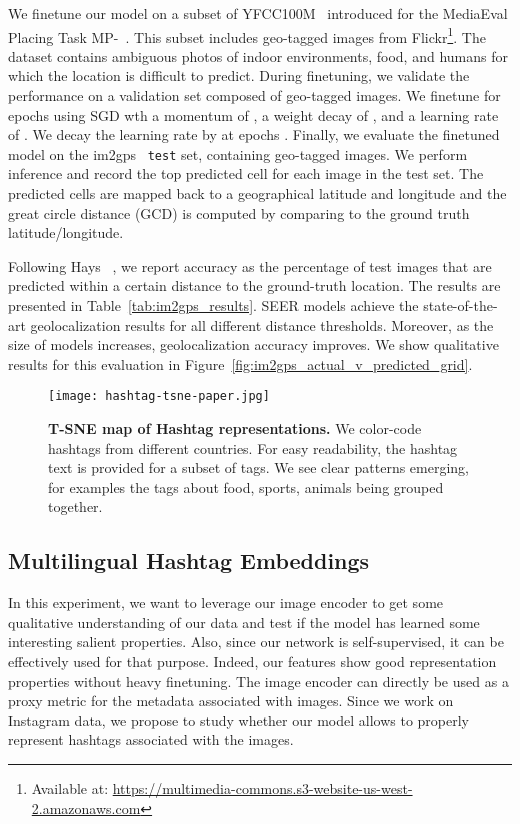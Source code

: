 \documentclass[10pt,twocolumn,letterpaper]{article}
\begin{document}
We finetune our model on a subset of YFCC100M~\cite{yfcc2016} introduced for the MediaEval Placing Task MP-~\cite{martha2017planet}.
This subset includes  geo-tagged images from Flickr\footnote{Available at: \url{https://multimedia-commons.s3-website-us-west-2.amazonaws.com}}.
The dataset contains ambiguous photos of indoor environments, food, and humans for which the location is difficult to predict. 
During finetuning, we validate the performance on a validation set composed of  geo-tagged images. 
We finetune for  epochs using SGD wth a momentum of , a weight decay of , and a learning rate of .
We decay the learning rate by  at epochs .
Finally, we evaluate the finetuned model on the im2gps~\cite{hays2008im2gps} \texttt{test} set, containing  geo-tagged images. 
We perform inference and record the top predicted cell for each image in the test set. 
The predicted cells are mapped back to a geographical latitude and longitude and the great circle distance (GCD) is computed by comparing to the ground truth latitude/longitude. 

Following Hays \etal~\cite{hays2008im2gps}, we report accuracy as the percentage of test images that are predicted within a certain distance to the ground-truth location. 
The results are presented in Table~\ref{tab:im2gps_results}. 
SEER models achieve the state-of-the-art geolocalization results for all different distance thresholds.
Moreover, as the size of models increases, geolocalization accuracy improves. 
We show qualitative results for this evaluation in Figure~\ref{fig:im2gps_actual_v_predicted_grid}. 



\begin{figure*}[t]
  \centering
  \texttt{[image: hashtag-tsne-paper.jpg]}
  \caption{
    \textbf{T-SNE map of Hashtag representations.}
    We color-code hashtags from different countries.
    For easy readability, the hashtag text is provided for a subset of  tags.
    We see clear patterns emerging, for examples the tags about food, sports, animals being grouped together.
  }
  \label{fig:tsne} \end{figure*}



\subsection{Multilingual Hashtag Embeddings}
\label{sec:multilingual_word_cloud}
In this experiment, we want to leverage our image encoder to get some qualitative understanding of our data and test if the model has learned some interesting salient properties.
Also, since our network is self-supervised, it can be effectively used for that purpose.
Indeed, our features show good representation properties without heavy finetuning.
The image encoder can directly be used as a proxy metric for the metadata associated with images.
Since we work on Instagram data, we propose to study whether our model allows to properly represent hashtags associated with the images. 
\end{document}

